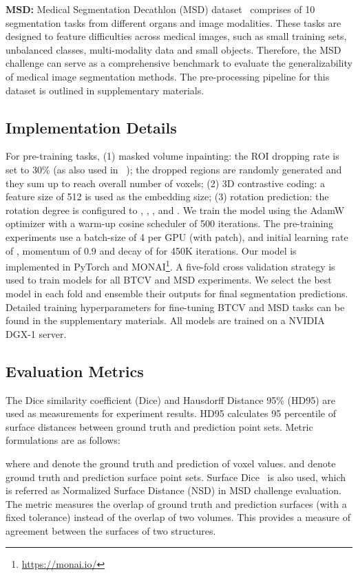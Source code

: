 \documentclass[10pt,twocolumn,letterpaper]{article}
\begin{document}
\textbf{MSD:} Medical Segmentation Decathlon (MSD) dataset~\cite{antonelli2021medical}
comprises of 10 segmentation tasks from different organs and image modalities. These tasks are designed to feature difficulties across medical images, such as small training sets, unbalanced classes, multi-modality data and small objects. Therefore, the MSD challenge can serve as a comprehensive benchmark to evaluate the generalizability of medical image segmentation methods. The pre-processing pipeline for this dataset is outlined in supplementary materials.

\subsection{Implementation Details}
For pre-training tasks, (1) masked volume inpainting: the ROI dropping rate is set to 30\% (as also used in ~\cite{atito2021sit}); the dropped regions are randomly generated and they sum up to reach overall number of voxels; (2) 3D contrastive coding: a feature size of 512 is used as the embedding size; (3) rotation prediction: the rotation degree is configured to , , , and . We train the model using the AdamW~\cite{loshchilov2018decoupled} optimizer with a warm-up cosine scheduler of 500 iterations. The pre-training experiments use a batch-size of 4 per GPU (with  patch), and initial learning rate of , momentum of 0.9 and decay of  for 450K iterations. Our model is implemented in PyTorch and MONAI\footnote{\href{https://monai.io/}{https://monai.io/}}. A five-fold cross validation strategy is used to train models for all BTCV and MSD experiments. We select the best model in each fold and ensemble their outputs for final segmentation predictions. Detailed training hyperparameters for fine-tuning BTCV and MSD tasks can be found in the supplementary materials. All models are trained on a NVIDIA DGX-1 server.

\subsection{Evaluation Metrics}
The Dice similarity coefficient (Dice) and Hausdorff Distance 95\% (HD95) are used as measurements for experiment results. HD95 calculates 95 percentile of surface distances between ground truth and prediction point sets. Metric formulations are as follows:


where  and  denote the ground truth and prediction of voxel values.  and  denote ground truth and prediction surface point sets. Surface Dice~\cite{nikolov2018deep} is also used, which is referred as Normalized Surface Distance (NSD) in MSD challenge evaluation. The metric measures the overlap of ground truth and prediction surfaces (with a fixed tolerance) instead of the overlap of two volumes. This provides a measure of agreement between the surfaces of two structures.
\end{document}
